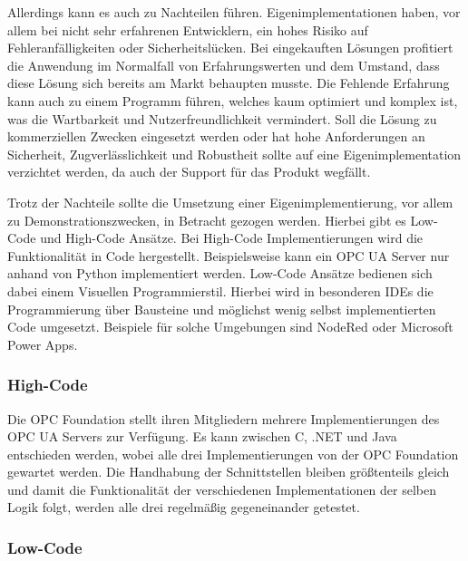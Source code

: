 \documentclass[a4paper, 12pt, oneside]{scrbook}
\begin{document}
		Allerdings kann es auch zu Nachteilen führen. Eigenimplementationen haben, vor allem bei nicht sehr erfahrenen Entwicklern, ein hohes Risiko auf Fehleranfälligkeiten oder Sicherheitslücken. Bei eingekauften Lösungen profitiert die Anwendung im Normalfall von Erfahrungswerten und dem Umstand, dass diese Lösung sich bereits am Markt behaupten musste. Die Fehlende Erfahrung kann auch zu einem Programm führen, welches kaum optimiert und komplex ist, was die Wartbarkeit und Nutzerfreundlichkeit vermindert. Soll die Lösung zu kommerziellen Zwecken eingesetzt werden oder hat hohe Anforderungen an Sicherheit, Zugverlässlichkeit und Robustheit sollte auf eine Eigenimplementation verzichtet werden, da auch der Support für das Produkt wegfällt.
		
		Trotz der Nachteile sollte die Umsetzung einer Eigenimplementierung, vor allem zu Demonstrationszwecken, in Betracht gezogen werden. Hierbei gibt es Low-Code und High-Code Ansätze. Bei High-Code Implementierungen wird die Funktionalität in Code hergestellt. Beispielsweise kann ein OPC UA Server nur anhand von Python implementiert werden. Low-Code Ansätze bedienen sich dabei einem Visuellen Programmierstil. Hierbei wird in besonderen IDEs die Programmierung über Bausteine und möglichst wenig selbst implementierten Code umgesetzt. Beispiele für solche Umgebungen sind NodeRed oder Microsoft Power Apps. 
		
			\subsubsection{High-Code}
			
			Die OPC Foundation stellt ihren Mitgliedern mehrere Implementierungen des OPC UA Servers zur Verfügung. Es kann zwischen C, .NET und Java entschieden werden, wobei alle drei Implementierungen von der OPC Foundation gewartet werden. Die Handhabung der Schnittstellen bleiben größtenteils gleich und damit die Funktionalität der verschiedenen Implementationen der selben Logik folgt, werden alle drei regelmäßig gegeneinander getestet.
			
			
			
			
			
			\subsubsection{Low-Code}
			
\end{document}
